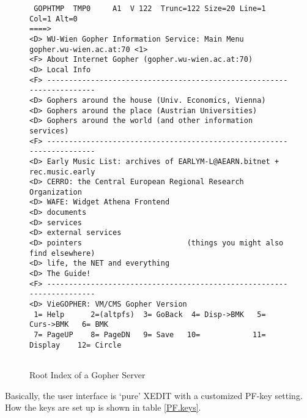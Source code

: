 \begin{figure}
\caption{Root Index of a Gopher Server}\label{run.cl1}
\rule{0mm}{2mm}
\begin{center}
\begin{small}
\begin{verbatim}
 GOPHTMP  TMP0     A1  V 122  Trunc=122 Size=20 Line=1 Col=1 Alt=0
====>
<D> WU-Wien Gopher Information Service: Main Menu
gopher.wu-wien.ac.at:70 <1>                                                  
<F> About Internet Gopher (gopher.wu-wien.ac.at:70)
<D> Local Info
<F> ----------------------------------------------------------------------
<D> Gophers around the house (Univ. Economics, Vienna)
<D> Gophers around the place (Austrian Universities)
<D> Gophers around the world (and other information services)
<F> ----------------------------------------------------------------------
<D> Early Music List: archives of EARLYM-L@AEARN.bitnet + rec.music.early
<D> CERRO: the Central European Regional Research Organization
<D> WAFE: Widget Athena Frontend
<D> documents
<D> services
<D> external services
<D> pointers                        (things you might also find elsewhere)
<D> life, the NET and everything
<D> The Guide!
<F> ----------------------------------------------------------------------
<D> VieGOPHER: VM/CMS Gopher Version
 1= Help      2=(altpfs)  3= GoBack  4= Disp->BMK   5= Curs->BMK   6= BMK  
 7= PageUP    8= PageDN   9= Save   10=            11= Display    12= Circle


\end{verbatim}
\end{small}
\end{center}
\rule{0mm}{2mm}
\end{figure}
 



Basically, the user interface is `pure' {\sf XEDIT} with a customized
PF-key setting.  How the keys are set up is shown in table \ref{PF.keys}.



